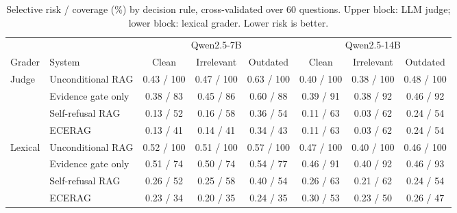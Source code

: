 \documentclass[conference,letterpaper]{IEEEtran}
\begin{document}
\begin{table}[t]
\caption{Selective risk / coverage (\%) by decision rule, cross-validated over 60 questions.
Upper block: LLM judge; lower block: lexical grader. Lower risk is better.}
\label{tab:decomp}
\centering
\begin{tabular}{llcccccc}
\toprule
& & \multicolumn{3}{c}{Qwen2.5-7B} & \multicolumn{3}{c}{Qwen2.5-14B}\\
\cmidrule(lr){3-5}\cmidrule(lr){6-8}
Grader & System & Clean & Irrelevant & Outdated & Clean & Irrelevant & Outdated\\
\midrule
\multirow{4}{*}{Judge}
& Unconditional RAG      & 0.43 / 100 & 0.47 / 100 & 0.63 / 100 & 0.40 / 100 & 0.38 / 100 & 0.48 / 100\\
& Evidence gate only     & 0.38 / 83  & 0.45 / 86  & 0.60 / 88  & 0.39 / 91  & 0.38 / 92  & 0.46 / 92\\
& Self-refusal RAG       & 0.13 / 52  & 0.16 / 58  & 0.36 / 54  & 0.11 / 63  & 0.03 / 62  & 0.24 / 54\\
& ECERAG                 & 0.13 / 41  & 0.14 / 41  & 0.34 / 43  & 0.11 / 63  & 0.03 / 62  & 0.24 / 54\\
\midrule
\multirow{4}{*}{Lexical}
& Unconditional RAG      & 0.52 / 100 & 0.51 / 100 & 0.57 / 100 & 0.47 / 100 & 0.40 / 100 & 0.46 / 100\\
& Evidence gate only     & 0.51 / 74  & 0.50 / 74  & 0.54 / 77  & 0.46 / 91  & 0.40 / 92  & 0.46 / 93\\
& Self-refusal RAG       & 0.26 / 52  & 0.25 / 58  & 0.40 / 54  & 0.26 / 63  & 0.21 / 62  & 0.24 / 54\\
& ECERAG                 & 0.23 / 34  & 0.20 / 35  & 0.24 / 35  & 0.30 / 53  & 0.23 / 50  & 0.26 / 47\\
\bottomrule
\end{tabular}
\end{table}
\end{document}
